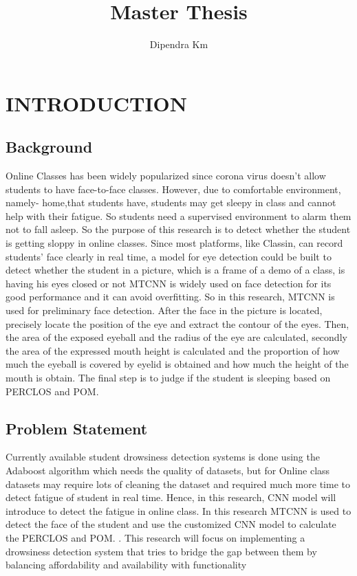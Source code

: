 \documentclass[a4paper,12pt]{report}
\title{Master Thesis}
\author{Dipendra Km}
\begin{document}
	
\chapter{INTRODUCTION}
\section{Background}
Online Classes has been widely popularized since corona virus doesn’t allow students to 
have face-to-face classes. However, due to comfortable environment, namely- home,that 
students have, students may get sleepy in class and cannot help with their fatigue. So 
students need a supervised environment to alarm them not to fall asleep. So the purpose of 
this research is to detect whether the student is getting sloppy in online classes. Since most 
platforms, like Classin, can record students’ face clearly in real time, a model for eye 
detection could be built to detect whether the student in a picture, which is a frame of a 
demo of a class, is having his eyes closed or not MTCNN is widely used on face detection 
for its good performance and it can avoid overfitting. So in this research, MTCNN is used 
for preliminary face detection. After the face in the picture is located, precisely locate the 
position of the eye and extract the contour of the eyes. Then, the area of the exposed eyeball 
and the radius of the eye are calculated, secondly the area of the expressed mouth height is 
calculated and the proportion of how much the eyeball is covered by eyelid is obtained and 
how much the height of the mouth is obtain. The final step is to judge if the student is 
sleeping based on PERCLOS and POM.

\section{Problem Statement}
Currently available student drowsiness detection systems is done using the Adaboost 
algorithm which needs the quality of datasets, but for Online class datasets may require 
lots of cleaning the dataset and required much more time to detect fatigue of student in 
real time. Hence, in this research, CNN model will introduce to detect the fatigue in online 
class. In this research MTCNN is used to detect the face of the student and use the customized CNN  model to calculate the PERCLOS and POM. . This research will focus on implementing a  drowsiness detection system that tries to bridge the gap between them by balancing  affordability and availability with functionality
\end{document}
